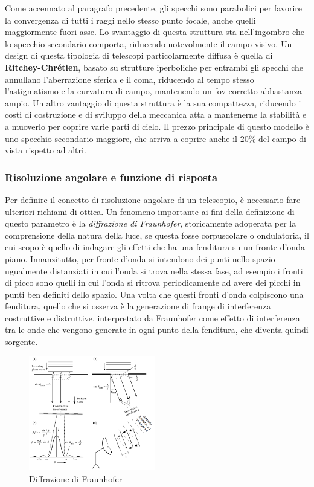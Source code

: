 \documentclass[a4paper,twoside,openany,notitlepage]{book}
\theoremstyle{definition}
\theoremstyle{plain}
\begin{document}
Come accennato al paragrafo precedente, gli specchi sono parabolici per favorire la convergenza di tutti i raggi nello stesso punto focale, anche quelli maggiormente fuori asse. Lo svantaggio di questa struttura sta nell'ingombro che lo specchio secondario comporta, riducendo notevolmente il campo visivo. Un design di questa tipologia di telescopi particolarmente diffusa è quella di \textbf{Ritchey-Chrétien}, basato su strutture iperboliche per entrambi gli specchi che annullano l'aberrazione sferica e il coma, riducendo al tempo stesso l'astigmatismo e la curvatura di campo, mantenendo un fov corretto abbastanza ampio. Un altro vantaggio di questa struttura è la sua compattezza, riducendo i costi di costruzione e di sviluppo della meccanica atta a mantenerne la stabilità e a muoverlo per coprire varie parti di cielo. Il prezzo principale di questo modello è uno specchio secondario maggiore, che arriva a coprire anche il $20\%$ del campo di vista rispetto ad altri.

\subsubsection*{Risoluzione angolare e funzione di risposta}

Per definire il concetto di risoluzione angolare di un telescopio, è necessario fare ulteriori richiami di ottica. Un fenomeno importante ai fini della definizione di questo parametro è la \textit{diffrazione di Fraunhofer}, storicamente adoperata per la comprensione della natura della luce, se questa fosse corpuscolare o ondulatoria, il cui scopo è quello di indagare gli effetti che ha una fenditura su un fronte d'onda piano. Innanzitutto, per fronte d'onda si intendono dei punti nello spazio ugualmente distanziati in cui l'onda si trova nella stessa fase, ad esempio i fronti di picco sono quelli in cui l'onda si ritrova periodicamente ad avere dei picchi in punti ben definiti dello spazio. Una volta che questi fronti d'onda colpiscono una fenditura, quello che si osserva è la generazione di frange di interferenza costruttive e distruttive, interpretato da Fraunhofer come effetto di interferenza tra le onde che vengono generate in ogni punto della fenditura, che diventa quindi sorgente.

\begin{figure}
	\vspace{-10pt}
	\centering
	\includegraphics[width=0.49\textwidth]{Immagini/Capitolo2/Fraunhofer.PNG}
	\caption*{Diffrazione di Fraunhofer}
	\vspace{-10pt}
\end{figure}
\end{document}
